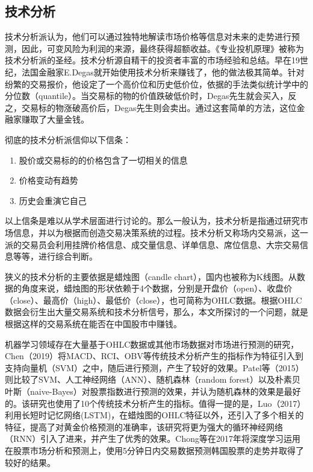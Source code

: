 \documentclass[twoside,longtitle]{LZUthesis}
\begin{document}
\subsection{技术分析}
技术分析派认为，他们可以通过独特地解读市场价格等信息对未来的走势进行预测，因此，可变风险为利润的来源，最终获得超额收益。《专业投机原理》\cite{weiketuo2010}被称为技术分析派的圣经。技术分析源自精干的投资者丰富的市场经验和总结。早在19世纪，法国金融家E.Degas就开始使用技术分析来赚钱了，他的做法极其简单。针对纷繁的交易报价，他设定了一个高价位和历史低价位，依据的手法类似统计学中的分位数（quantile）。当交易标的物的价值跌破低价时，Degas先生就会买入，反之，交易标的物涨破高价后，Degas先生则会卖出。通过这套简单的方法，这位金融家赚取了大量金钱。

彻底的技术分析派信仰以下信条：
\begin{enumerate}
    \item 股价或交易标的的价格包含了一切相关的信息
    \item 价格变动有趋势
    \item 历史会重演它自己
\end{enumerate}

以上信条是难以从学术层面进行讨论的。那么一般认为，技术分析是指通过研究市场信息，并以为根据而创造交易决策系统的过程。技术分析又称场内交易派，这一派的交易员会利用挂牌价格信息、成交量信息、详单信息、席位信息、大宗交易信息等等，进行综合判断。

狭义的技术分析的主要依据是蜡烛图（candle chart），国内也被称为K线图。从数据的角度来说，蜡烛图的形状依赖于4个数据，分别是开盘价（open）、收盘价（close）、最高价（high）、最低价（close），也可简称为OHLC数据。根据OHLC数据会衍生出大量交易系统和技术分析信号，那么，本文所探讨的一个问题，就是根据这样的交易系统在能否在中国股市中赚钱。

机器学习领域存在大量基于OHLC数据或其他市场数据对市场进行预测的研究，Chen（2019）\cite{chenfangfang2019}将MACD、RCI、OBV等传统技术分析产生的指标作为特征引入到支持向量机（SVM）之中，随后进行预测，产生了较好的效果。Patel等（2015）\cite{Patel2015Predicting}则比较了SVM、人工神经网络（ANN）、随机森林（random forest）以及朴素贝叶斯（naive-Bayes）对股票指数进行预测的效果，并认为随机森林的效果是最好的。该研究也使用了10个传统技术分析产生的指标。值得一提的是，Luo（2017）\cite{骆双骏2017基于深度学习的黄金期货价格预测}利用长短时记忆网络(LSTM)，在蜡烛图的OHLC特征以外，还引入了多个相关的特征，提高了对黄金价格预测的准确率，该研究将更为强大的循环神经网络（RNN）引入了进来，并产生了优秀的效果。Chong等在2017年将深度学习运用在股票市场分析和预测上，使用5分钟日内交易数据预测韩国股票的走势并取得了较好的结果。\cite{chong2017deep}
\end{document}
